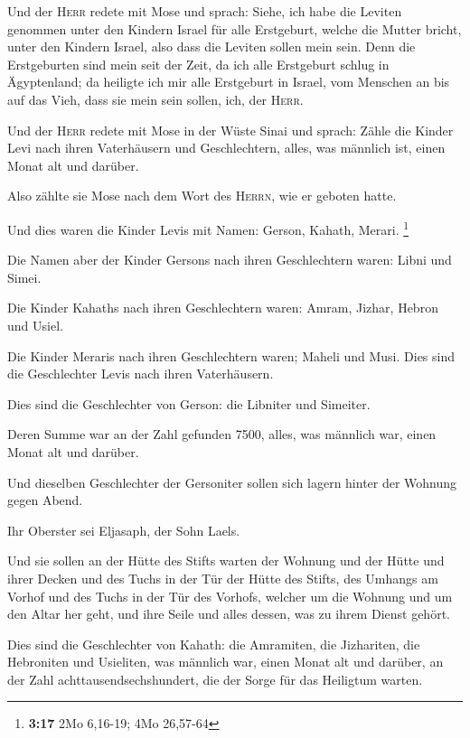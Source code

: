  Und der \textsc{Herr} redete mit Mose und sprach:
 Siehe, ich habe die Leviten genommen unter den Kindern
Israel für alle Erstgeburt, welche die Mutter bricht, unter den Kindern
Israel, also dass die Leviten sollen mein sein.  Denn die
Erstgeburten sind mein seit der Zeit, da ich alle Erstgeburt schlug in
Ägyptenland; da heiligte ich mir alle Erstgeburt in Israel, vom Menschen
an bis auf das Vieh, dass sie mein sein sollen, ich, der \textsc{Herr}.

 Und der \textsc{Herr} redete mit Mose in der Wüste Sinai
und sprach:  Zähle die Kinder Levi nach ihren
Vaterhäusern und Geschlechtern, alles, was männlich ist, einen Monat alt
und darüber.

 Also zählte sie Mose nach dem Wort des \textsc{Herrn},
wie er geboten hatte.

 Und dies waren die Kinder Levis mit Namen: Gerson,
Kahath, Merari. \footnote{\textbf{3:17} 2Mo 6,16-19; 4Mo 26,57-64}

 Die Namen aber der Kinder Gersons nach ihren
Geschlechtern waren: Libni und Simei.

 Die Kinder Kahaths nach ihren Geschlechtern waren:
Amram, Jizhar, Hebron und Usiel.

 Die Kinder Meraris nach ihren Geschlechtern waren;
Maheli und Musi. Dies sind die Geschlechter Levis nach ihren
Vaterhäusern.

 Dies sind die Geschlechter von Gerson: die Libniter und
Simeiter.

 Deren Summe war an der Zahl gefunden 7500, alles, was
männlich war, einen Monat alt und darüber.

 Und dieselben Geschlechter der Gersoniter sollen sich
lagern hinter der Wohnung gegen Abend.

 Ihr Oberster sei Eljasaph, der Sohn Laels.

 Und sie sollen an der Hütte des Stifts warten der
Wohnung und der Hütte und ihrer Decken und des Tuchs in der Tür der
Hütte des Stifts,  des Umhangs am Vorhof und des Tuchs in
der Tür des Vorhofs, welcher um die Wohnung und um den Altar her geht,
und ihre Seile und alles dessen, was zu ihrem Dienst gehört.

 Dies sind die Geschlechter von Kahath: die Amramiten,
die Jizhariten, die Hebroniten und Usieliten,  was
männlich war, einen Monat alt und darüber, an der Zahl
achttausendsechshundert, die der Sorge für das Heiligtum warten.

